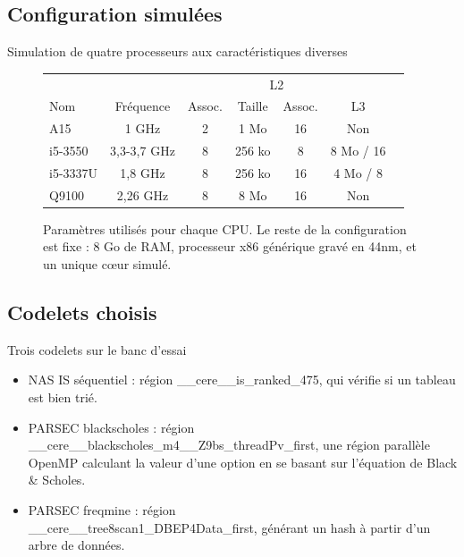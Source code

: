 \documentclass{beamer}
\begin{document}
\subsection{Configuration simulées}
\begin{frame}{Simulation de quatre processeurs aux caractéristiques diverses}
\begin{figure}[ht]
\begin{center}

\begin{tabular}{| l | c | c | c | c | c | c |}
\hline 
& & & \multicolumn{2}{c|}{L2} &\\
Nom & Fréquence & Assoc. & Taille & Assoc. & L3 \\
\hline

A15 & 1 GHz & 2 & 1 Mo & 16 & Non \\

i5-3550 & 3,3-3,7 GHz & 8 & 256 ko & 8 & 8 Mo / 16\\

i5-3337U & 1,8 GHz & 8 & 256 ko & 16 & 4 Mo / 8\\

Q9100 & 2,26 GHz & 8 & 8 Mo & 16 & Non\\
\hline

\end{tabular}
\caption{\label{cpu_setup}Paramètres utilisés pour chaque CPU. Le reste de la configuration est fixe : 8 Go de RAM, processeur x86 générique gravé en 44nm, et un unique cœur simulé.}
\end{center}
\end{figure}
\end{frame}

\subsection{Codelets choisis}
\begin{frame}{Trois codelets sur le banc d'essai}
\begin{itemize}
\item NAS IS séquentiel : région \_\_cere\_\_is\_ranked\_475, qui vérifie si un tableau est bien trié.
\item PARSEC blackscholes : région \\ \_\_cere\_\_blackscholes\_m4\_\_Z9bs\_threadPv\_first, une région parallèle OpenMP calculant la valeur d'une option en se basant sur l'équation de Black \& Scholes.
\item PARSEC freqmine : région\\ \_\_cere\_\_tree8scan1\_DBEP4Data\_first, générant un hash à partir d'un arbre de données.
\end{itemize}
\end{frame}
\end{document}
